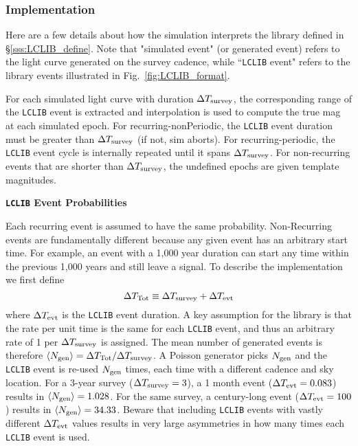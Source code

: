 \documentclass[12pt]{article}
\begin{document}
\newcommand{\dTsim}{\Delta T_{\rm survey}}
\newcommand{\dTtot}{\Delta T_{\rm Tot}}
\newcommand{\dTevt}{\Delta T_{\rm evt}}
\newcommand{\AVGnonrecur}{ \langle N_{\rm gen}\rangle}
\newcommand{\Nnonrecur}{ N_{\rm gen} }

\subsubsection{ Implementation }
\label{sss:LCLIB_implem}
Here are a few details about how the simulation interprets the library 
defined in \S\ref{sss:LCLIB_define}. Note that "simulated event" 
(or generated event) refers to the light curve generated on the 
survey cadence, while ``{\tt LCLIB} event" refers to the library 
events illustrated in Fig.~\ref{fig:LCLIB_format}.

For each simulated light curve with duration
$\dTsim$, the corresponding range of the {\tt LCLIB} event is extracted and
interpolation is used to compute the  true mag at each simulated epoch.
For  recurring-nonPeriodic, the {\tt LCLIB} event duration must be greater
than $\dTsim$ (if not, sim aborts). For recurring-periodic, the {\tt LCLIB}
event cycle is internally repeated until it spans $\dTsim$.
For non-recurring events that are shorter than $\dTsim$, the undefined
epochs are given template magnitudes. 

\medskip \centerline{\bf {\tt LCLIB} Event Probabilities}
Each recurring event is assumed to have the same probability.
Non-Recurring events are fundamentally different because any given 
event has an arbitrary start time. For example, an event with a 1,000 year 
duration can start any time within the previous 1,000 years and still
leave a signal. To describe the implementation we first define
\begin{equation}
    \dTtot \equiv   \dTsim + \dTevt
\end{equation}
%
where $\dTevt$ is the {\tt LCLIB} event duration. 
A key assumption for the library is that the rate per unit time is 
the same for each {\tt LCLIB} event, and thus an arbitrary rate of 
1 per $\dTsim$ is assigned.  The mean number of generated events  
is therefore  $\AVGnonrecur = \dTtot/\dTsim$. 
A Poisson generator picks $\Nnonrecur$ and the {\tt LCLIB} event
is re-used $\Nnonrecur$ times, each time with a different cadence
and sky location. 
For a 3-year survey ($\dTsim=3$), a 1 month event ($\dTevt=0.083$)
results in $\AVGnonrecur = 1.028$. 
For the same survey, a century-long event ($\dTevt=100$) 
results in $\AVGnonrecur = 34.33$.  
Beware that including {\tt LCLIB} events with vastly different 
$\dTevt$ values results in very large asymmetries in how many times
 each {\tt LCLIB} event is used.
\end{document}

